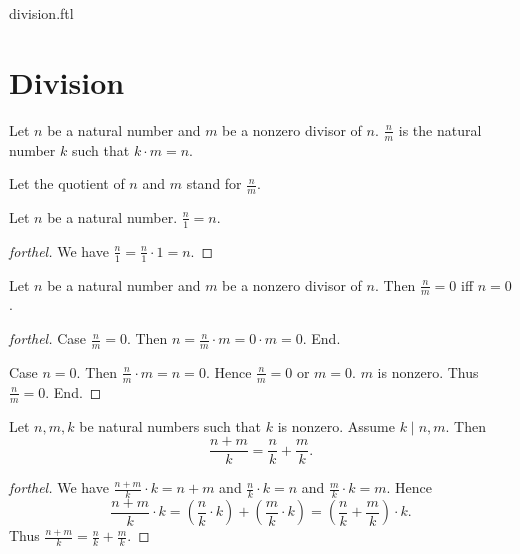 \documentclass{naproche-library}
\begin{document}
\begin{smodule}{division.ftl}

  \section*{Division}

  \begin{definition}[forthel,id=ARITHMETIC_14_2313654268297915]
    Let $n$ be a natural number and $m$ be a nonzero divisor of $n$.
    $\frac{n}{m}$ is the natural number $k$ such that $k \cdot m = n$.
  \end{definition}

  Let the quotient of $n$ and $m$ stand for $\frac{n}{m}$.

  \begin{proposition}[forthel,id=ARITHMETIC_14_0843793254698710]
    Let $n$ be a natural number.
    $\frac{n}{1} = n$.
  \end{proposition}
  \begin{proof}[forthel]
    We have $\frac{n}{1}
      = \frac{n}{1} \cdot 1
      = n$.
  \end{proof}

  \begin{proposition}[forthel,id=ARITHMETIC_14_1254235698632545]
    Let $n$ be a natural number and $m$ be a nonzero divisor of $n$.
    Then $\frac{n}{m} = 0$ iff $n = 0$.
  \end{proposition}
  \begin{proof}[forthel]
    Case $\frac{n}{m} = 0$.
      Then $n
        = \frac{n}{m} \cdot m
        = 0 \cdot m
        = 0$.
    End.

    Case $n = 0$.
      Then $\frac{n}{m} \cdot m
        = n
        = 0$.
      Hence $\frac{n}{m} = 0$ or $m = 0$.
      $m$ is nonzero.
      Thus $\frac{n}{m} = 0$.
    End.
  \end{proof}

  \begin{proposition}[forthel,id=ARITHMETIC_14_5137961454123875]
    Let $n, m, k$ be natural numbers such that $k$ is nonzero.
    Assume $k \mid n,m$.
    Then \[\frac{n + m}{k} = \frac{n}{k} + \frac{m}{k}.\]
  \end{proposition}
  \begin{proof}[forthel]
    We have $\frac{n + m}{k} \cdot k = n + m$ and $\frac{n}{k} \cdot k = n$ and $\frac{m}{k} \cdot k = m$.
    Hence
    \[  \frac{n + m}{k} \cdot k
        = \left( \frac{n}{k} \cdot k \right) + \left( \frac{m}{k} \cdot k \right)
        = \left( \frac{n}{k} + \frac{m}{k} \right) \cdot k. \]
    Thus $\frac{n + m}{k} = \frac{n}{k} + \frac{m}{k}$.
  \end{proof}


\end{smodule}
\end{document}
